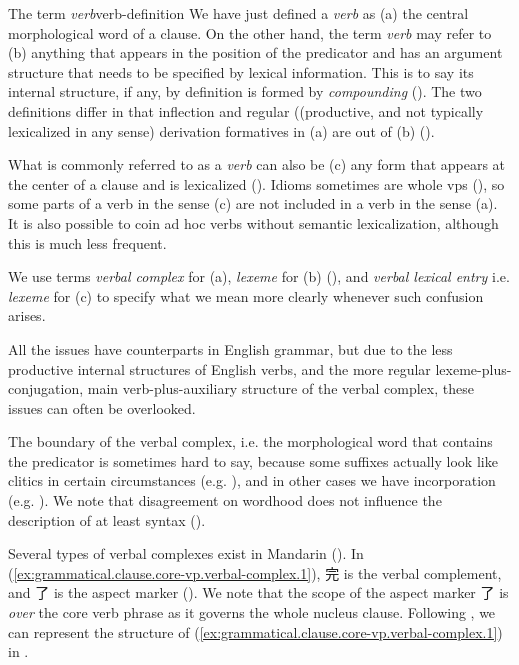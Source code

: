 \documentclass[UTF8, a4paper, oneside, scheme=plain, 12pt]{ctexrep}
\newcommand*{\term}[1]{\emph{#1}}
\begin{document}
\begin{theorybox}{The term \term{verb}}{verb-definition}
    We have just defined a \term{verb} as (a) the central morphological word of a clause.
    On the other hand, the term \term{verb} may refer to
    (b) anything that appears in the position of the predicator and has an argument structure
    that needs to be specified by lexical information.
    This is to say its internal structure, if any,
    by definition is formed by \term{compounding} ().
    The two definitions differ in that inflection and regular ((productive, and not typically lexicalized in any sense) derivation formatives in (a)
    are out of (b) ().
    
    What is commonly referred to as a \term{verb} 
    can also be (c) any form that appears at the center of a clause and is lexicalized (). 
    Idioms sometimes are whole \acp{vp} (),
    so some parts of a verb in the sense (c) are not included in a verb in the sense (a).
    It is also possible to coin ad hoc verbs without semantic lexicalization,
    although this is much less frequent.

    We use terms \term{verbal complex} for (a), \term{lexeme} for (b) (),
    and \term{verbal lexical entry} i.e. \term{lexeme} for (c)
    to specify what we mean more clearly whenever such confusion arises.

    All the issues have counterparts in English grammar,
    but due to the less productive internal structures of English verbs,
    and the more regular lexeme-plus-conjugation, main verb-plus-auxiliary structure of the verbal complex,
    these issues can often be overlooked.
\end{theorybox}

The boundary of the verbal complex, i.e. the morphological word that contains the predicator
is sometimes hard to say,
because some suffixes actually look like clitics in certain circumstances
(e.g. ),
and in other cases we have incorporation (e.g. ).
We note that disagreement on wordhood does not influence the description of at least syntax
().

Several types of verbal complexes exist in Mandarin
().
In (\ref{ex:grammatical.clause.core-vp.verbal-complex.1}),
完 is the verbal complement, and 了 is the aspect marker
().
We note that the scope of the aspect marker 了 is \emph{over} the core verb phrase
as it governs the whole nucleus clause.
Following ,
we can represent the structure of (\ref{ex:grammatical.clause.core-vp.verbal-complex.1})
in .
\end{document}
